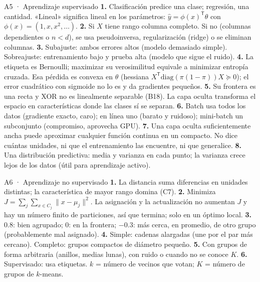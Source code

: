 \begin{solucion}{A5 · Aprendizaje supervisado}
\textbf{1.} Clasificación predice una clase; regresión, una cantidad. «Lineal» significa lineal en los parámetros: $\hat y=\phi(x)^\mathsf T\theta$ con $\phi(x)=(1,x,x^2,\dots)$.
\textbf{2.} Si $X$ tiene rango columna completo. Si no (columnas dependientes o $n<d$), se usa pseudoinversa, regularización (ridge) o se eliminan columnas.
\textbf{3.} Subajuste: ambos errores altos (modelo demasiado simple). Sobreajuste: entrenamiento bajo y prueba alta (modelo que sigue el ruido).
\textbf{4.} La etiqueta es Bernoulli; maximizar su verosimilitud equivale a minimizar entropía cruzada. Esa pérdida es convexa en $\theta$
(hessiana $X^\mathsf T\mathrm{diag}(\pi(1-\pi))X\succeq0$); el error cuadrático con sigmoide no lo es y da gradientes pequeños.
\textbf{5.} Su frontera es una recta y XOR no es linealmente separable (B18). La capa oculta transforma el espacio en
características donde las clases sí se separan.
\textbf{6.} Batch usa todos los datos (gradiente exacto, caro); en línea uno (barato y ruidoso); mini-batch un subconjunto (compromiso, aprovecha GPU).
\textbf{7.} Una capa oculta suficientemente ancha puede aproximar cualquier función continua en un compacto. No dice cuántas
unidades, ni que el entrenamiento las encuentre, ni que generalice.
\textbf{8.} Una distribución predictiva: media y varianza en cada punto; la varianza crece lejos de los datos (útil para aprendizaje activo).
\end{solucion}

\begin{solucion}{A6 · Aprendizaje no supervisado}
\textbf{1.} La distancia suma diferencias en unidades distintas; la característica de mayor rango domina (C7).
\textbf{2.} Minimiza $J=\sum_j\sum_{x\in C_j}\|x-\mu_j\|^2$. La asignación y la actualización no aumentan $J$ y hay un número finito de
particiones, así que termina; solo en un óptimo local.
\textbf{3.} $0.8$: bien agrupado; $0$: en la frontera; $-0.3$: más cerca, en promedio, de otro grupo (probablemente mal asignado).
\textbf{4.} Simple: cadenas alargadas (une por el par más cercano). Completo: grupos compactos de diámetro pequeño.
\textbf{5.} Con grupos de forma arbitraria (anillos, medias lunas), con ruido o cuando no se conoce $K$.
\textbf{6.} Supervisado: usa etiquetas. $k$ = número de vecinos que votan; $K$ = número de grupos de $k$-means.
\end{solucion}

